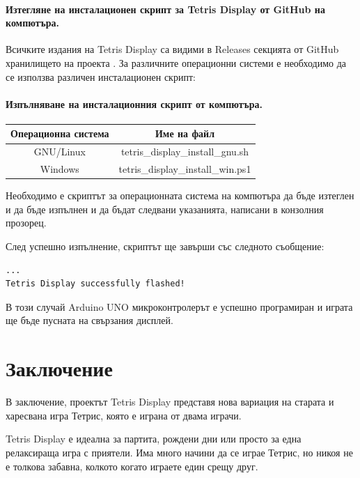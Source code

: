 \documentclass[titlepage, oneside, 14pt]{extbook}
\renewcommand{\texttt}[1]{{\small\ttfamily #1}}
\newcommand{\ard}{Arduino\texttrademark{}}
\begin{document}
\subsubsection{Изтегляне на инсталационен скрипт за Tetris Display от GitHub на компютъра.}

Всичките издания на Tetris Display са видими в Releases секцията от GitHub хранилището на проекта \cite{github}.
За различните операционни системи е необходимо да се използва различен инсталационен скрипт:

\subsubsection{Изпълняване на инсталационния скрипт от компютъра.}

\begin{center}
  \begin{tabular}{c|c}
    Операционна система & Име на файл \\ 
    \hline
    GNU/Linux & \texttt{tetris_display_install_gnu.sh} \\  
    Windows & \texttt{tetris_display_install_win.ps1} \\  
  \end{tabular}
\end{center}

Необходимо е скриптът за операционната система на компютъра да бъде изтеглен и
да бъде изпълнен и да бъдат следвани указанията, написани в конзолния прозорец.

След успешно изпълнение, скриптът ще завърши със следното съобщение:

\begin{verbatim}
...
Tetris Display successfully flashed!
\end{verbatim}

В този случай \ard{} UNO микроконтролерът е успешно програмиран и играта ще бъде пусната на свързания дисплей.

\tableofcontents


\chapter*{Заключение}

В заключение, проектът Tetris Display представя нова вариация на старата и харесвана игра Тетрис,
която е играна от двама играчи.

\textmd{Tetris Display} е идеална за партита, рождени дни или просто за една релаксираща
игра с приятели. Има много начини да се играе \textmd{Тетрис}, но никоя не е толкова
забавна, колкото когато играете един срещу друг.

\printbibliography[heading=bibliography,title={Използвана литература}]
\end{document}
